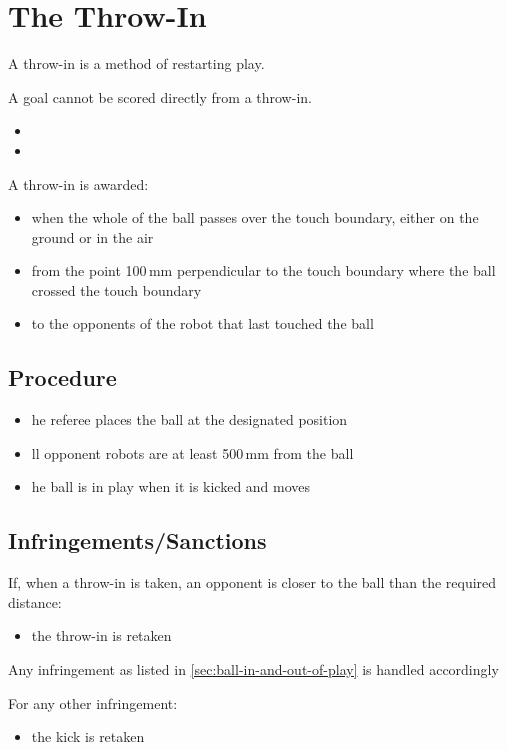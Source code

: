 \section{The Throw-In}\label{sec:throw-in}

A throw-in is a method of restarting play.

A goal cannot be scored directly from a throw-in.

\begin{itemize}
\item {}
\item {}
\end{itemize}

A throw-in is awarded:

\begin{itemize}
\item when the whole of the ball passes over the touch boundary, either on the ground or in the air
\item from the point 100\,mm perpendicular to the touch boundary where the ball crossed the touch boundary
\item to the opponents of the robot that last touched the ball
\end{itemize}

\subsection{Procedure}
\begin{itemize}
\item {}he referee places the ball at the designated position
\item {}ll opponent robots are at least 500\,mm from the ball
\item {}he ball is in play when it is kicked and moves
\end{itemize}

\subsection{Infringements/Sanctions}
If, when a throw-in is taken, an opponent is closer to the ball than the required distance:

\begin{itemize}
\item the throw-in is retaken
\end{itemize}

Any infringement as listed in \autoref{sec:ball-in-and-out-of-play} is handled accordingly

For any other infringement:

\begin{itemize}
\item the kick is retaken
\end{itemize}
